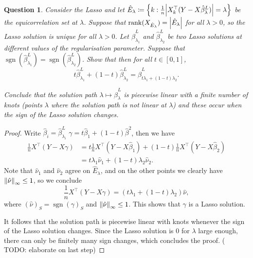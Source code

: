 \documentclass{article}
\theoremstyle{plain}
\newtheorem{question}{Question}
\theoremstyle{remark}
\newcommand{\T}{^\top} %
\newcommand\ceq\coloneqq %
\newcommand\TODO{{\color{red} TODO: }}
\DeclareMathOperator{\sign}{sgn}
\begin{document}
\begin{question}
	Consider the Lasso and let $\hat E_\lambda \ceq \qty{k : \frac1n \abs{X_k\T (Y - X\hat\beta_\lambda^L)} = \lambda}$ be the equicorrelation set at $\lambda$. Suppose that $\rank(X_{\hat E_\lambda}) = \abs{\hat E_\lambda}$ for all $\lambda > 0$, so the Lasso solution is unique for all $\lambda > 0$. Let $\hat\beta_{\lambda_1}^L$ and $\hat\beta_{\lambda_2}^L$ be two Lasso solutions at different values of the regularisation parameter. Suppose that $\sign(\hat\beta_{\lambda_1}^L) = \sign(\hat\beta_{\lambda_2}^L)$. Show that then for all $t \in [0, 1]$,
	\[
	t \hat \beta_{\lambda_1}^L + (1-t) \hat\beta_{\lambda_2}^L = \hat\beta_{t \lambda_1 + (1-t)\lambda_2}^L.
	\]
	
	Conclude that the solution path $\lambda \mapsto \hat\beta_\lambda^L$ is piecewise linear with a finite number of knots (points $\lambda$ where the solution path is not linear at $\lambda$) and these occur when the sign of the Lasso solution changes. 
\end{question}

\begin{proof}
	Write $\hat\beta_i = \hat\beta^L_{\lambda_i}$ $\gamma = t \hat\beta_{1} + (1-t) \hat\beta^{2}$, then we have
	\begin{align*}
	\frac1n X\T(Y - X\gamma) &= t \frac1n X\T(Y - X\hat\beta_1) + (1-t) \frac1n X\T (Y - X\hat\beta_2) \\
	&= t \lambda_1 \hat \nu_1 + (1-t)\lambda_2 \hat\nu_2. 
	\end{align*}
	Note that $\hat\nu_1$ and $\hat\nu_2$ agree on $\hat E_\lambda$, and on the other points we clearly have $\norm{\hat\nu}_\infty \leq 1$, so we conclude
	\[
	\frac1n X\T (Y - X\gamma) = (t\lambda_1 + (1-t)\lambda_2) \hat\nu, 
	\]
	where $(\hat\nu)_S = \sign(\gamma)_S$ and $\norm{\hat\nu}_\infty \leq 1$. This shows that $\gamma$ is a Lasso solution.
	
	It follows that the solution path is piecewise linear with knots whenever the sign of the Lasso solution changes. Since the Lasso solution is 0 for $\lambda$ large enough, there can only be finitely many sign changes, which concludes the proof. (\TODO elaborate on last step)
\end{proof}
\end{document}
